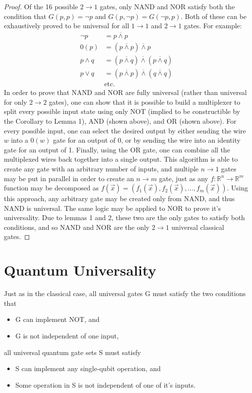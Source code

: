 \documentclass[12pt]{article}
\newcommand{\nand}{\overline{\land}}
\begin{document}
\begin{proof}
    Of the 16 possible $2 \to 1$ gates, only NAND and NOR satisfy both the condition that $G(p, p) = \neg p$ and $G(p, \neg p) = G(\neg p, p)$.
    Both of these can be exhaustively proved to be universal for all $1 \to 1$ and $2 \to 1$ gates. For example:
    \begin{align}
        \neg p &= p \nand p \\
        0(p) &= (p \nand p) \nand p \\
        p \land q &= (p \nand q) \nand (p \nand q) \\
        p \lor q &= (p \nand p) \nand (q \nand q) \\
        &\text{etc.}
    \end{align}
    In order to prove that NAND and NOR are fully universal (rather than universal for only $2 \to 2$ gates), one can show that it is possible to build a multiplexer to split every possible input state using only NOT (implied to be constructible by the Corollary to Lemma 1), AND (shown above), and OR (shown above). For every possible input, one can select the desired output by either sending the wire $w$ into a $0(w)$ gate for an output of 0, or by sending the wire into an identity gate for an output of 1. Finally, using the OR gate, one can combine all the multiplexed wires back together into a single output.
    This algorithm is able to create any gate with an arbitrary number of inputs, and multiple $n \to 1$ gates may be put in parallel in order to create an $n \to m$ gate, just as any $f: \mathbb{R}^n \to \mathbb{R}^m$ function may be decomposed as $f(\overrightarrow{x}) = (f_1(\overrightarrow{x}), f_2(\overrightarrow{x}), \dots, f_m(\overrightarrow{x}))$.
    Using this approach, any arbitrary gate may be created only from NAND, and thus NAND is universal. The same logic may be applied to NOR to prove it's universality. Due to lemmas 1 and 2, these two are the only gates to satisfy both conditions, and so NAND and NOR are the only $2 \to 1$ universal classical gates.
\end{proof}

\section{Quantum Universality}
Just as in the classical case, all universal gates G must satisfy the two conditions that
\begin{itemize}
    \item G can implement NOT, and
    \item G is not independent of one input,
\end{itemize}
all universal quantum gate sets S must satisfy
\begin{itemize}
    \item S can implement any single-qubit operation, and
    \item Some operation in S is not independent of one of it's inputs.
\end{itemize}
\end{document}

